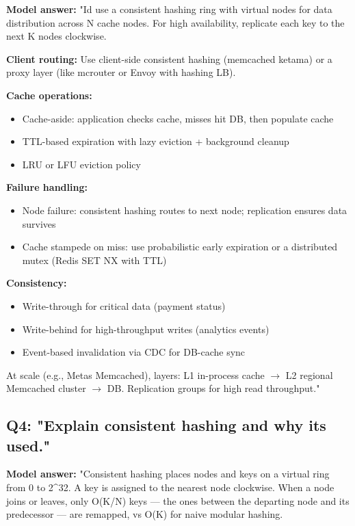 \documentclass[11pt]{article}
\providecommand{\tightlist}{\setlength{\itemsep}{1pt}\setlength{\parskip}{0pt}}
\begin{document}
\textbf{Model answer:}
"I\textquotesingle d use a consistent hashing ring with virtual nodes for data distribution across N cache nodes. For high availability, replicate each key to the next K nodes clockwise.

\textbf{Client routing:} Use client-side consistent hashing (memcached ketama) or a proxy layer (like mcrouter or Envoy with hashing LB).

\textbf{Cache operations:}

\begin{itemize}
\tightlist
\item
  Cache-aside: application checks cache, misses hit DB, then populate cache
\item
  TTL-based expiration with lazy eviction + background cleanup
\item
  LRU or LFU eviction policy
\end{itemize}

\textbf{Failure handling:}

\begin{itemize}
\tightlist
\item
  Node failure: consistent hashing routes to next node; replication ensures data survives
\item
  Cache stampede on miss: use probabilistic early expiration or a distributed mutex (Redis SET NX with TTL)
\end{itemize}

\textbf{Consistency:}

\begin{itemize}
\tightlist
\item
  Write-through for critical data (payment status)
\item
  Write-behind for high-throughput writes (analytics events)
\item
  Event-based invalidation via CDC for DB-cache sync
\end{itemize}

At scale (e.g., Meta\textquotesingle s Memcached), layers: L1 in-process cache \(\rightarrow\) L2 regional Memcached cluster \(\rightarrow\) DB. Replication groups for high read throughput."

\subsection{Q4: "Explain consistent hashing and why it\textquotesingle s used."}\label{q4-explain-consistent-hashing-and-why-its-used}

\textbf{Model answer:}
"Consistent hashing places nodes and keys on a virtual ring from 0 to 2\^{}32. A key is assigned to the nearest node clockwise. When a node joins or leaves, only O(K/N) keys --- the ones between the departing node and its predecessor --- are remapped, vs O(K) for naive modular hashing.
\end{document}
